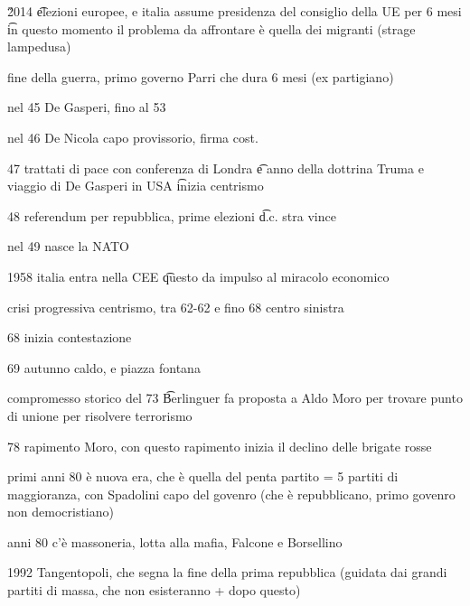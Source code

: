 \documentclass[12pt]{article}
\begin{document}
\v

2014 \t elezioni europee, e italia assume presidenza del consiglio della UE per 6 mesi \t in questo momento il problema da affrontare è quella dei migranti (strage lampedusa)

\bi
  \item fine della guerra, primo governo Parri che dura 6 mesi (ex partigiano) 
  \item nel 45 De Gasperi, fino al 53
  \item nel 46 De Nicola capo provissorio, firma cost.
  \item 47 trattati di pace con conferenza di Londra \t e anno della dottrina Truma e viaggio di De Gasperi in USA \t inizia centrismo
  \item 48 referendum per repubblica, prime elezioni \t d.c. stra vince
  \item nel 49 nasce la NATO
  \item 1958 italia entra nella CEE \t questo da impulso al miracolo economico
  \item crisi progressiva centrismo, tra 62-62 e fino 68 centro sinistra
  \item 68 inizia contestazione
  \item 69 autunno caldo, e piazza fontana
  \item compromesso storico del 73 \t Berlinguer fa proposta a Aldo Moro per trovare punto di unione per risolvere terrorismo
  \item 78 rapimento Moro, con questo rapimento inizia il declino delle brigate rosse
  \item primi anni 80 è nuova era, che è quella del penta partito = 5 partiti di maggioranza, con Spadolini capo del govenro (che è repubblicano, primo govenro non democristiano)
  \item anni 80 c'è massoneria, lotta alla mafia, Falcone e Borsellino
  \item 1992 Tangentopoli, che segna la fine della prima repubblica (guidata dai grandi partiti di massa, che non esisteranno + dopo questo)
\ei
\end{document}
